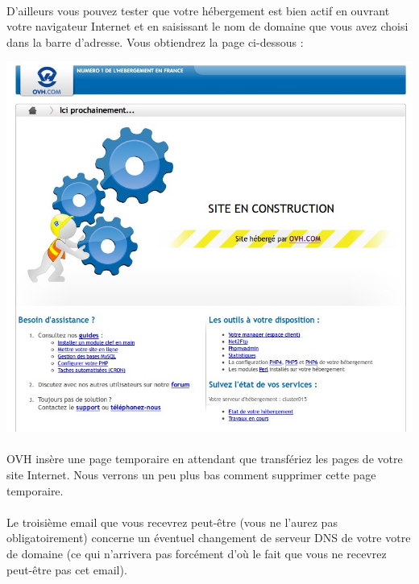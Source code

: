 \documentclass[10pt,a4paper]{article}
\begin{document}
\paragraph{}D'ailleurs vous pouvez tester que votre hébergement est bien actif en ouvrant votre navigateur Internet et en saisissant le nom de domaine que vous avez choisi dans la barre d'adresse. Vous obtiendrez la page ci-dessous :
\begin{center}
\includegraphics[scale=0.4]{img/0290.png}
\end{center}
\paragraph{}OVH insère une page temporaire en attendant que transfériez les pages de votre site Internet. Nous verrons un peu plus bas comment supprimer cette page temporaire.
\newpage
\paragraph{}Le troisième email que vous recevrez peut-être (vous ne l'aurez pas obligatoirement) concerne un éventuel changement de serveur DNS de votre votre de domaine (ce qui n'arrivera pas forcément d'où le fait que vous ne recevrez peut-être pas cet email).
\end{document}

